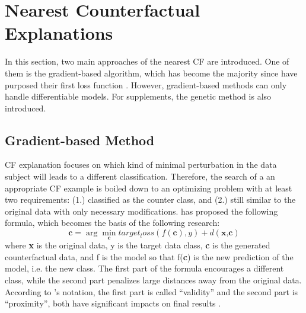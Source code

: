 \section{Nearest Counterfactual Explanations}\label{sec:generation}
In this section, two main approaches of the nearest CF are introduced. One of them is the gradient-based algorithm, which has become the majority since \citeauthor{watcher2017} \cite{watcher2017} have purposed their first loss function \cite{CFReview}. However, gradient-based methods can only handle differentiable models. For supplements, the genetic method is also introduced.

\subsection{Gradient-based Method}\label{sec:lossFunc}
CF explanation focuses on which kind of minimal perturbation in the data subject will leads to a different classification. Therefore, the search of a an appropriate CF example is boiled down to an optimizing problem with at least two requirements: (1.) classified as the counter class, and (2.) still similar to the original data with only necessary modifications. \citeauthor{watcher2017} \cite{watcher2017} has proposed the following formula, which becomes the basis of the following research:
\begin{equation}\label{eq:watcher}
  \textbf{c}=\arg\min_{\textbf{c}}target_loss(f(\textbf{c}),y)+d(\textbf{x,c})
\end{equation}
where \textbf{x} is the original data, y is the target data class, \textbf{c} is the generated counterfactual data, and f is the model so that f(\textbf{c}) is the new prediction of the model, i.e. the new class. The first part of the formula encourages a different class, while the second part penalizes large distances away from the original data. According to \citeauthor{watcher2017}'s notation, the first part is called ``validity'' and the second part is ``proximity'', both have significant impacts on final results \cite{watcher2017}.

